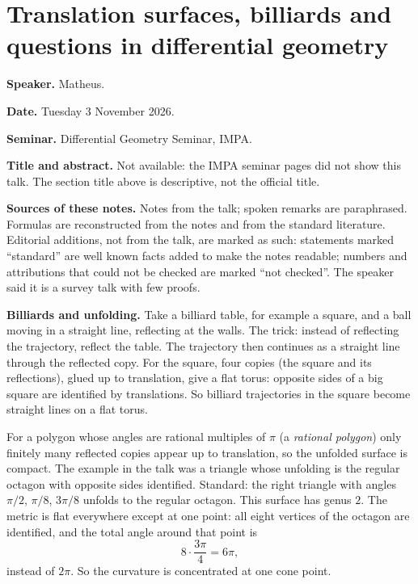 \section{Translation surfaces, billiards and
questions in differential geometry}
\label{section-matheus-translation-surfaces}

\medskip\noindent
{\bf Speaker.} Matheus.

\medskip\noindent
{\bf Date.} Tuesday 3 November 2026.

\medskip\noindent
{\bf Seminar.} Differential Geometry Seminar,
IMPA.

\medskip\noindent
{\bf Title and abstract.} Not available: the
IMPA seminar pages did not show this talk.
The section title above is descriptive, not
the official title.

\medskip\noindent
{\bf Sources of these notes.} Notes from the
talk; spoken remarks are paraphrased.
Formulas are reconstructed from the notes
and from the standard literature.
Editorial additions, not from the talk, are
marked as such: statements marked
``standard'' are well known facts added to
make the notes readable; numbers and
attributions that could not be checked are
marked ``not checked''.
The speaker said it is a survey talk with few
proofs.

\medskip\noindent
{\bf Billiards and unfolding.} Take a
billiard table, for example a square, and a
ball moving in a straight line, reflecting at
the walls. The trick: instead of reflecting
the trajectory, reflect the table. The
trajectory then continues as a straight line
through the reflected copy. For the square,
four copies (the square and its reflections),
glued up to translation, give a flat torus:
opposite sides of a big square are identified
by translations. So billiard trajectories in
the square become straight lines on a flat
torus.

For a polygon whose angles are rational
multiples of $\pi$ (a \emph{rational
polygon}) only finitely many reflected copies
appear up to translation, so the unfolded
surface is compact. The example in the talk
was a triangle whose unfolding is the regular
octagon with opposite sides identified.
Standard: the right triangle with angles
$\pi/2$, $\pi/8$, $3\pi/8$ unfolds to the
regular octagon. This surface has genus $2$.
The metric is flat everywhere except at one
point: all eight vertices of the octagon are
identified, and the total angle around that
point is
$$
8\cdot\frac{3\pi}{4}=6\pi,
$$
instead of $2\pi$. So the curvature is
concentrated at one cone point.

